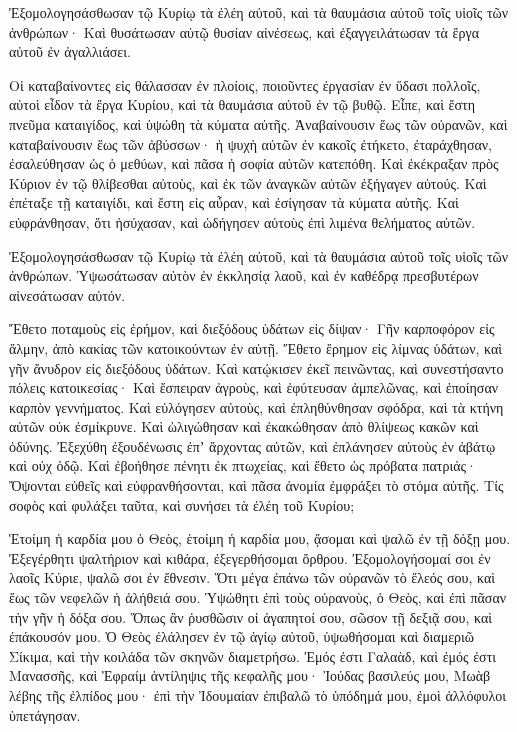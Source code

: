 \begin{spacing}{1.1}
\begin{multicols}{2}
Ἐξομολογησάσθωσαν τῷ Κυρίῳ τὰ ἐλέη αὐτοῦ, καὶ τὰ θαυμάσια αὐτοῦ τοῖς υἱοῖς τῶν ἀνθρώπων·
Καὶ θυσάτωσαν αὐτῷ θυσίαν αἰνέσεως, καὶ ἐξαγγειλάτωσαν τὰ ἔργα αὐτοῦ ἐν ἀγαλλιάσει.

Οἱ καταβαίνοντες εἰς θάλασσαν ἐν πλοίοις, ποιοῦντες ἐργασίαν ἐν ὕδασι πολλοῖς,
αὐτοὶ εἶδον τὰ ἔργα Κυρίου, καὶ τὰ θαυμάσια αὐτοῦ ἐν τῷ βυθῷ.
Εἶπε, καὶ ἔστη πνεῦμα καταιγίδος, καὶ ὑψώθη τὰ κύματα αὐτῆς.
Ἀναβαίνουσιν ἕως τῶν οὐρανῶν, καὶ καταβαίνουσιν ἕως τῶν ἀβύσσων· ἡ ψυχὴ αὐτῶν ἐν κακοῖς ἐτήκετο,
ἐταράχθησαν, ἐσαλεύθησαν ὡς ὁ μεθύων, καὶ πᾶσα ἡ σοφία αὐτῶν κατεπόθη.
Καὶ ἐκέκραξαν πρὸς Κύριον ἐν τῷ θλίβεσθαι αὐτοὺς, καὶ ἐκ τῶν ἀναγκῶν αὐτῶν ἐξήγαγεν αὐτούς.
Καὶ ἐπέταξε τῇ καταιγίδι, καὶ ἔστη εἰς αὖραν, καὶ ἐσίγησαν τὰ κύματα αὐτῆς.
Καὶ εὐφράνθησαν, ὅτι ἡσύχασαν, καὶ ὡδήγησεν αὐτοὺς ἐπὶ λιμένα θελήματος αὐτῶν.

Ἐξομολογησάσθωσαν τῷ Κυρίῳ τὰ ἐλέη αὐτοῦ, καὶ τὰ θαυμάσια αὐτοῦ τοῖς υἱοῖς τῶν ἀνθρώπων.
Ὑψωσάτωσαν αὐτὸν ἐν ἐκκλησίᾳ λαοῦ, καὶ ἐν καθέδρᾳ πρεσβυτέρων αἰνεσάτωσαν αὐτόν.

Ἔθετο ποταμοὺς εἰς ἐρήμον, καὶ διεξόδους ὑδάτων εἰς δίψαν·
Γῆν καρποφόρον εἰς ἅλμην, ἀπὸ κακίας τῶν κατοικούντων ἐν αὐτῇ.
Ἔθετο ἔρημον εἰς λίμνας ὑδάτων, καὶ γῆν ἄνυδρον εἰς διεξόδους ὑδάτων.
Καὶ κατῴκισεν ἐκεῖ πεινῶντας, καὶ συνεστήσαντο πόλεις κατοικεσίας·
Καὶ ἔσπειραν ἀγροὺς, καὶ ἐφύτευσαν ἀμπελῶνας, καὶ ἐποίησαν καρπὸν γεννήματος.
Καὶ εὐλόγησεν αὐτοὺς, καὶ ἐπληθύνθησαν σφόδρα, καὶ τὰ κτήνη αὐτῶν οὐκ ἐσμίκρυνε.
Καὶ ὠλιγώθησαν καὶ ἐκακώθησαν ἀπὸ θλίψεως κακῶν καὶ ὀδύνης.
Ἐξεχύθη ἐξουδένωσις ἐπʼ ἄρχοντας αὐτῶν, καὶ ἐπλάνησεν αὐτοὺς ἐν ἀβάτῳ καὶ οὐχ ὁδῷ.
Καὶ ἐβοήθησε πένητι ἐκ πτωχείας, καὶ ἔθετο ὡς πρόβατα πατριάς·
Ὄψονται εὐθεῖς καὶ εὐφρανθήσονται, καὶ πᾶσα ἀνομία ἐμφράξει τὸ στόμα αὐτῆς.
Τίς σοφὸς καὶ φυλάξει ταῦτα, καὶ συνήσει τὰ ἐλέη τοῦ Κυρίου;

Ἑτοίμη ἡ καρδία μου ὁ Θεὸς, ἑτοίμη ἡ καρδία μου, ᾄσομαι καὶ ψαλῶ ἐν τῇ δόξῃ μου.
Ἐξεγέρθητι ψαλτήριον καὶ κιθάρα, ἐξεγερθήσομαι ὄρθρου.
Ἐξομολογήσομαί σοι ἐν λαοῖς Κύριε, ψαλῶ σοι ἐν ἔθνεσιν.
Ὅτι μέγα ἐπάνω τῶν οὐρανῶν τὸ ἔλεός σου, καὶ ἕως τῶν νεφελῶν ἡ ἀλήθειά σου.
Ὑψώθητι ἐπὶ τοὺς οὐρανοὺς, ὁ Θεὸς, καὶ ἐπὶ πᾶσαν τὴν γῆν ἡ δόξα σου.
Ὅπως ἂν ῥυσθῶσιν οἱ ἀγαπητοί σου, σῶσον τῇ δεξιᾷ σου, καὶ ἐπάκουσόν μου.
Ὁ Θεὸς ἐλάλησεν ἐν τῷ ἁγίῳ αὐτοῦ, ὑψωθήσομαι καὶ διαμεριῶ Σίκιμα, καὶ τὴν κοιλάδα τῶν σκηνῶν διαμετρήσω.
Ἐμός ἐστι Γαλαὰδ, καὶ ἐμός ἐστι Μανασσῆς, καὶ Ἐφραίμ ἀντίληψις τῆς κεφαλῆς μου· Ἰούδας βασιλεύς μου,
Μωὰβ λέβης τῆς ἐλπίδος μου· ἐπὶ τὴν Ἰδουμαίαν ἐπιβαλῶ τὸ ὑπόδημά μου, ἐμοὶ ἀλλόφυλοι ὑπετάγησαν.


\end{multicols}
\end{spacing}
